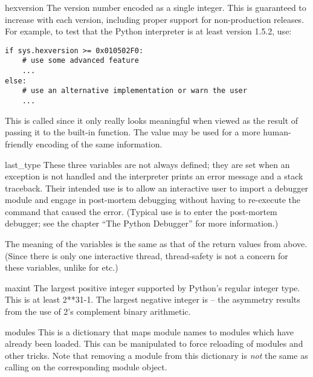 \begin{datadesc}{hexversion}
The version number encoded as a single integer.  This is guaranteed to
increase with each version, including proper support for
non-production releases.  For example, to test that the Python
interpreter is at least version 1.5.2, use:

\begin{verbatim}
if sys.hexversion >= 0x010502F0:
    # use some advanced feature
    ...
else:
    # use an alternative implementation or warn the user
    ...
\end{verbatim}

This is called  since it only really looks meaningful
when viewed as the result of passing it to the built-in
 function.  The  value may be used
for a more human-friendly encoding of the same information.
\end{datadesc}

\begin{datadesc}{last_type}
These three variables are not always defined; they are set when an
exception is not handled and the interpreter prints an error message
and a stack traceback.  Their intended use is to allow an interactive
user to import a debugger module and engage in post-mortem debugging
without having to re-execute the command that caused the error.
(Typical use is  to enter the post-mortem
debugger; see the chapter ``The Python Debugger'' for more
information.)

The meaning of the variables is the same
as that of the return values from  above.
(Since there is only one interactive thread, thread-safety is not a
concern for these variables, unlike for  etc.)
\end{datadesc}

\begin{datadesc}{maxint}
The largest positive integer supported by Python's regular integer
type.  This is at least 2**31-1.  The largest negative integer is
 -- the asymmetry results from the use of 2's
complement binary arithmetic.
\end{datadesc}

\begin{datadesc}{modules}
  This is a dictionary that maps module names to modules which have
  already been loaded.  This can be manipulated to force reloading of
  modules and other tricks.  Note that removing a module from this
  dictionary is \emph{not} the same as calling
   on the corresponding module
  object.
\end{datadesc}

